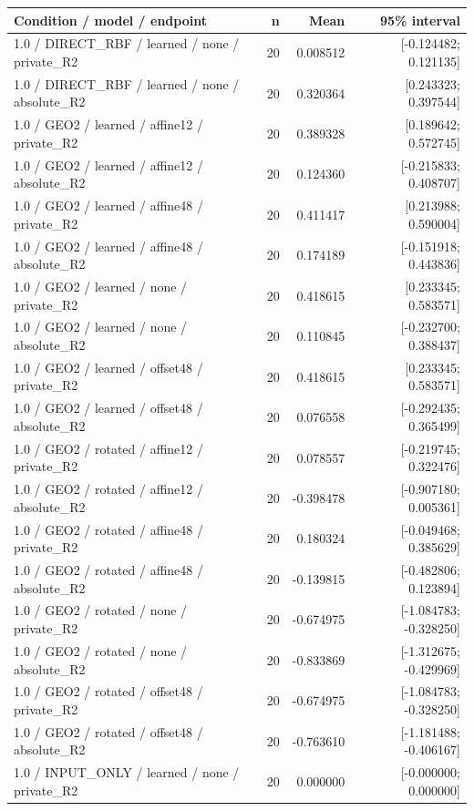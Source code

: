 \begin{longtable}{p{.56\linewidth}rrr}
\toprule Condition / model / endpoint & n & Mean & 95\% interval\\\midrule
1.0 / DIRECT\_RBF / learned / none / private\_R2 & 20 & 0.008512 & [-0.124482; 0.121135] \\
1.0 / DIRECT\_RBF / learned / none / absolute\_R2 & 20 & 0.320364 & [0.243323; 0.397544] \\
1.0 / GEO2 / learned / affine12 / private\_R2 & 20 & 0.389328 & [0.189642; 0.572745] \\
1.0 / GEO2 / learned / affine12 / absolute\_R2 & 20 & 0.124360 & [-0.215833; 0.408707] \\
1.0 / GEO2 / learned / affine48 / private\_R2 & 20 & 0.411417 & [0.213988; 0.590004] \\
1.0 / GEO2 / learned / affine48 / absolute\_R2 & 20 & 0.174189 & [-0.151918; 0.443836] \\
1.0 / GEO2 / learned / none / private\_R2 & 20 & 0.418615 & [0.233345; 0.583571] \\
1.0 / GEO2 / learned / none / absolute\_R2 & 20 & 0.110845 & [-0.232700; 0.388437] \\
1.0 / GEO2 / learned / offset48 / private\_R2 & 20 & 0.418615 & [0.233345; 0.583571] \\
1.0 / GEO2 / learned / offset48 / absolute\_R2 & 20 & 0.076558 & [-0.292435; 0.365499] \\
1.0 / GEO2 / rotated / affine12 / private\_R2 & 20 & 0.078557 & [-0.219745; 0.322476] \\
1.0 / GEO2 / rotated / affine12 / absolute\_R2 & 20 & -0.398478 & [-0.907180; 0.005361] \\
1.0 / GEO2 / rotated / affine48 / private\_R2 & 20 & 0.180324 & [-0.049468; 0.385629] \\
1.0 / GEO2 / rotated / affine48 / absolute\_R2 & 20 & -0.139815 & [-0.482806; 0.123894] \\
1.0 / GEO2 / rotated / none / private\_R2 & 20 & -0.674975 & [-1.084783; -0.328250] \\
1.0 / GEO2 / rotated / none / absolute\_R2 & 20 & -0.833869 & [-1.312675; -0.429969] \\
1.0 / GEO2 / rotated / offset48 / private\_R2 & 20 & -0.674975 & [-1.084783; -0.328250] \\
1.0 / GEO2 / rotated / offset48 / absolute\_R2 & 20 & -0.763610 & [-1.181488; -0.406167] \\
1.0 / INPUT\_ONLY / learned / none / private\_R2 & 20 & 0.000000 & [-0.000000; 0.000000] \\

\end{longtable}
